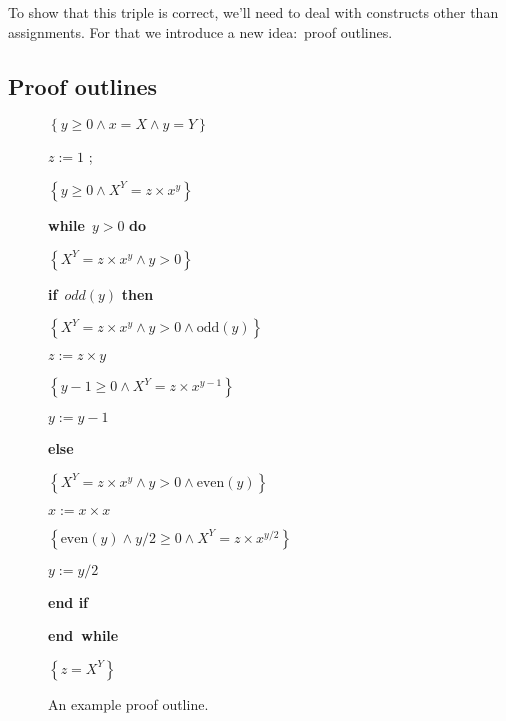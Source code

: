 \documentclass[muchmore,11pt]{article}%
\begin{document}
To show that this triple is correct, we'll need to deal with constructs other
than assignments. For that we introduce a new idea:\ proof outlines.

\subsection{Proof outlines}%

\begin{figure}[tb]%


\begin{code}
$\left\{  y\geq0\wedge x=X\wedge y=Y\right\}  $

$z:=1$ ;

$\left\{  y\geq0\wedge X^{Y}=z\times x^{y}\right\}  $

\textbf{while}\ $y>0$ \textbf{do}

\begin{indent}
\item $\left\{  X^{Y}=z\times x^{y}\wedge y>0\right\}  $

\item \textbf{if}\ \textrm{$odd$}$(y)$ \textbf{then}

\begin{indent}
\item $\left\{  X^{Y}=z\times x^{y}\wedge y>0\wedge\mathrm{odd}(y)\right\}  $

\item $z:=z\times y$

\item $\left\{  y-1\geq0\wedge X^{Y}=z\times x^{y-1}\right\}  $

\item $y:=y-1$
\end{indent}

\item \textbf{else}

\begin{indent}
\item $\left\{  X^{Y}=z\times x^{y}\wedge y>0\wedge\mathrm{even}(y)\right\}  $

\item $x:=x\times x$

\item $\left\{  \mathrm{even}(y)\wedge y/2\geq0\wedge X^{Y}=z\times
x^{y/2}\right\}  $

\item $y:=y/2$
\end{indent}

\item \textbf{end if}
\end{indent}

\thinspace\textbf{end\ while}

$\left\{  z=X^{Y}\right\}  $
\end{code}

%

\caption{An example proof outline.}\label{po}\end{figure}%
\end{document}
